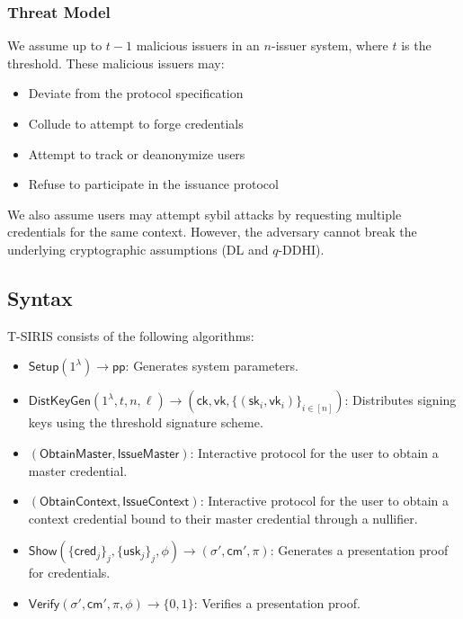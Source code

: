 \subsubsection{Threat Model}
We assume up to $t-1$ malicious issuers in an $n$-issuer system, where $t$ is the threshold. These malicious issuers may:
\begin{itemize}
    \item Deviate from the protocol specification
    \item Collude to attempt to forge credentials
    \item Attempt to track or deanonymize users
    \item Refuse to participate in the issuance protocol
\end{itemize}

We also assume users may attempt sybil attacks by requesting multiple credentials for the same context. However, the adversary cannot break the underlying cryptographic assumptions (DL and $q$-DDHI).




\subsection{Syntax}

T-SIRIS consists of the following algorithms:

\begin{itemize}
    \item $\mathsf{Setup}(1^\lambda) \to \mathsf{pp}$: Generates system parameters.
    
    \item $\mathsf{DistKeyGen}(1^\lambda, t, n, \ell) \to (\mathsf{ck}, \mathsf{vk}, \{(\mathsf{sk}_i, \mathsf{vk}_i)\}_{i \in [n]})$: Distributes signing keys using the threshold signature scheme.
    
    \item $(\mathsf{ObtainMaster}, \mathsf{IssueMaster})$: Interactive protocol for the user to obtain a master credential.
    
    \item $(\mathsf{ObtainContext}, \mathsf{IssueContext})$: Interactive protocol for the user to obtain a context credential bound to their master credential through a nullifier.
    
    \item $\mathsf{Show}(\{\mathsf{cred}_j\}_j, \{\mathsf{usk}_j\}_j, \phi) \to (\sigma', \mathsf{cm}', \pi)$: Generates a presentation proof for credentials.
    
    \item $\mathsf{Verify}(\sigma', \mathsf{cm}', \pi, \phi) \to \{0,1\}$: Verifies a presentation proof.
\end{itemize}





